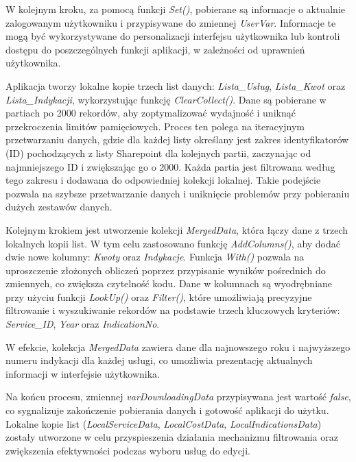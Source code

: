 W kolejnym kroku, za pomocą funkcji \emph{Set()}, pobierane są informacje o aktualnie zalogowanym użytkowniku i przypisywane do zmiennej \emph{UserVar}. Informacje te mogą być wykorzystywane do personalizacji interfejsu użytkownika lub kontroli dostępu do poszczególnych funkcji aplikacji, w zależności od uprawnień użytkownika.

Aplikacja tworzy lokalne kopie trzech list danych: \emph{Lista_Usług}, \emph{Lista_Kwot} oraz \emph{Lista_Indykacji}, wykorzystując funkcję \emph{ClearCollect()}. Dane są pobierane w partiach po 2000 rekordów, aby zoptymalizować wydajność i uniknąć przekroczenia limitów pamięciowych. Proces ten polega na iteracyjnym przetwarzaniu danych, gdzie dla każdej listy określany jest zakres identyfikatorów (ID) pochodzących z listy Sharepoint dla kolejnych partii, zaczynając od najmniejszego ID i zwiększając go o 2000. Każda partia jest filtrowana według tego zakresu i dodawana do odpowiedniej kolekcji lokalnej. Takie podejście pozwala na szybsze przetwarzanie danych i uniknięcie problemów przy pobieraniu dużych zestawów danych.

Kolejnym krokiem jest utworzenie kolekcji \emph{MergedData}, która łączy dane z trzech lokalnych kopii list. W tym celu zastosowano funkcję \emph{AddColumns()}, aby dodać dwie nowe kolumny: \emph{Kwoty} oraz \emph{Indykacje}. Funkcja \emph{With()} pozwala na uproszczenie złożonych obliczeń poprzez przypisanie wyników pośrednich do zmiennych, co zwiększa czytelność kodu. Dane w kolumnach są wyodrębniane przy użyciu funkcji \emph{LookUp()} oraz \emph{Filter()}, które umożliwiają precyzyjne filtrowanie i wyszukiwanie rekordów na podstawie trzech kluczowych kryteriów: \emph{Service_ID}, \emph{Year} oraz \emph{IndicationNo}.

W efekcie, kolekcja \emph{MergedData} zawiera dane dla najnowszego roku i najwyższego numeru indykacji dla każdej usługi, co umożliwia prezentację aktualnych informacji w interfejsie użytkownika.

Na końcu procesu, zmiennej \emph{varDownloadingData} przypisywana jest wartość \emph{false}, co sygnalizuje zakończenie pobierania danych i gotowość aplikacji do użytku. Lokalne kopie list (\emph{LocalServiceData}, \emph{LocalCostData}, \emph{LocalIndicationsData}) zostały utworzone w celu przyspieszenia działania mechanizmu filtrowania oraz zwiększenia efektywności podczas wyboru usług do edycji.




